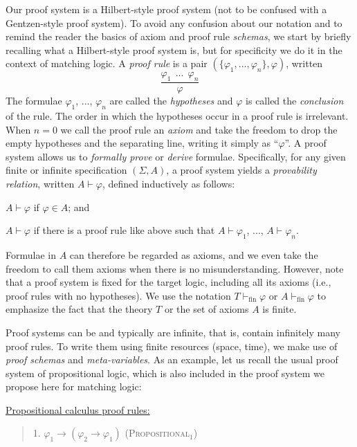 \documentclass[UTF8,11pt]{article}
\theoremstyle{plain}
\theoremstyle{definition}
\theoremstyle{remark}
\newcommand{\vdashfin}{\vdash_\text{fin}}
\newcommand{\ra}{\rightarrow}
\begin{document}
\newcommand{\sequent}[2]{{#1}\vdash{#2}}

Our proof system is a Hilbert-style proof system (not to be confused with a
Gentzen-style proof system).
To avoid any confusion about our notation and to remind the reader the
basics of axiom and proof rule \emph{schemas}, we start by briefly recalling
what a Hilbert-style proof system is, but for specificity we do it in the
context of matching logic.
A \emph{proof rule} is a pair $(\{\varphi_1,...,\varphi_n\},\varphi)$,
written
$$
\frac{
\varphi_1 \ \ ... \ \ \varphi_n
}{\varphi}
$$
The formulae $\varphi_1$, ..., $\varphi_n$ are called the \emph{hypotheses}
and $\varphi$ is called the \emph{conclusion} of the rule.
The order in which the hypotheses occur in a proof rule is irrelevant.
When $n = 0$ we call the proof rule an \emph{axiom} and take the freedom to
drop the empty hypotheses and the separating line, writing it simply as
``$\varphi$''.
A proof system allows us to \emph{formally prove} or \emph{derive} formulae.
Specifically, for any given finite or infinite specification $(\Sigma,A)$,
a proof system yields a \emph{provability relation},
written $\sequent{A}{\varphi}$, defined inductively as follows:

$\sequent{A}{\varphi}$ if $\varphi \in A$; and

$\sequent{A}{\varphi}$ if there is a proof rule like above such that
$\sequent{A}{\varphi_1}$, ..., $\sequent{A}{\varphi_n}$.

\noindent
Formulae in $A$ can therefore be regarded as axioms, and we even take the
freedom to call them axioms when there is no misunderstanding.
However, note that a proof system is fixed for the target logic, including
all its axioms (i.e., proof rules with no hypotheses).
We use the notation $T \vdashfin \varphi$ or $A \vdashfin \varphi$ to emphasize the fact that the theory $T$ or the set of axioms $A$ is finite.

Proof systems can be and typically are infinite, that is, contain infinitely
many proof rules.
To write them using finite resources (space, time), we make use of \emph{proof schemas}
and \emph{meta-variables}.
As an example, let us recall the usual proof system of propositional logic,
which is also included in the proof system we propose here for matching logic:

\vspace*{2ex}

\noindent
\underline{Propositional calculus proof rules:}

\begin{quote}
1. $\varphi_1 \ra (\varphi_2 \ra \varphi_1)$
\hfill \textsc{(Propositional$_1$)}
\end{quote}
\end{document}
